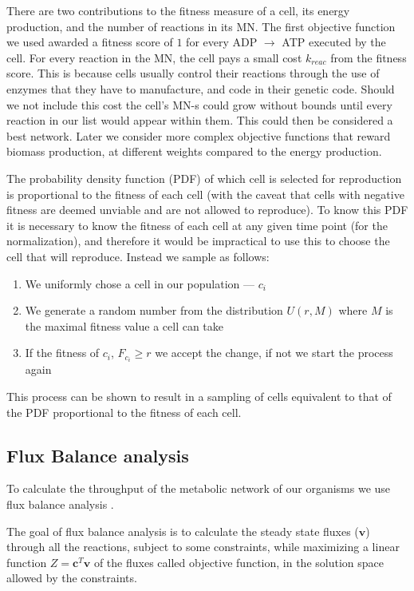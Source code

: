 \documentclass[a4paper,12pt]{article}
\begin{document}
There are two contributions to the fitness measure of a cell, its energy production, and the number of reactions in its MN.  The first objective function we used awarded a fitness score of $1$ for every ADP $\rightarrow$ ATP executed by the cell. For every reaction in the MN, the cell pays a small cost $k_{reac}$  from the fitness score. This is because cells usually control their reactions through the use of enzymes that they have to manufacture, and code in their genetic code. Should we not include this cost the cell's MN-s could grow without bounds until every reaction in our list would appear within them. This could then be considered a best network. Later we consider more complex objective functions that reward biomass production, at different weights compared to the energy production. 

The probability density function (PDF) of which cell is selected for reproduction is proportional to the fitness of each cell (with the caveat that cells with negative fitness are deemed unviable and are not allowed to reproduce). To know this PDF it is necessary to know the fitness of each cell at any given time point (for the normalization), and therefore it would be impractical to use this to choose the cell that will reproduce. Instead we sample as follows: 
\begin{enumerate}
	\item We uniformly chose a cell in our population --- $c_i$
	\item We generate a random number from the distribution $U \left( r,M \right)$ where $M$ is the maximal fitness value a cell can take
	\item If the fitness of $c_i$,  $F_{c_i} \geq r$ we accept the change, if not we start the process again
\end{enumerate}

This process can be shown to result in a sampling of cells equivalent to that of the PDF proportional to the fitness of each cell.


\subsection{Flux Balance analysis}
\label{sub:Flux Balance analysis}


	To calculate the throughput of the metabolic network of our organisms we use flux balance analysis \cite{whatisfluxbalance}. 	

	The goal of flux balance analysis is to calculate the steady state fluxes ($\mathbf{v}$) through all the reactions, subject to some constraints, while maximizing a linear function $Z=\mathbf{c}^T \mathbf{v}$ of the fluxes called objective function, in the solution space allowed by the constraints. 
\end{document}
